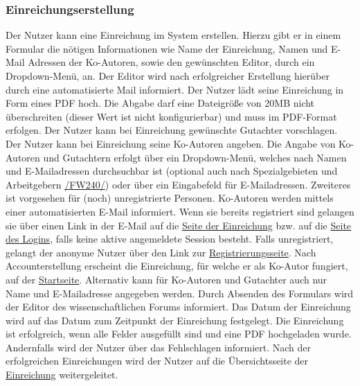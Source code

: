 \subsubsection{Einreichungserstellung}\label{nut:eein}
\begin{description}
     Der Nutzer kann eine Einreichung im System erstellen. Hierzu gibt er in einem
    Formular die nötigen Informationen wie Name der Einreichung, Namen und E-Mail Adressen der Ko-Autoren,
    sowie den gewünschten Editor, durch ein Dropdown-Menü, an. Der Editor wird nach erfolgreicher Erstellung hierüber durch eine
    automatisierte Mail informiert.
     Der Nutzer lädt seine Einreichung in Form eines PDF hoch. Die Abgabe darf eine Dateigröße
    von 20MB nicht überschreiten (dieser Wert ist nicht konfigurierbar) und muss im PDF-Format erfolgen.
     Der Nutzer kann bei Einreichung gewünschte Gutachter vorschlagen.
     Der Nutzer kann bei Einreichung seine Ko-Autoren angeben.
     Die Angabe von Ko-Autoren und Gutachtern erfolgt über ein Dropdown-Menü, welches
    nach Namen und E-Mailadressen durchsuchbar ist (optional auch nach Spezialgebieten und Arbeitgebern \hyperref[funkt:240]{/FW240/})
    oder über ein Eingabefeld für E-Mailadressen. Zweiteres ist vorgesehen für (noch) unregistrierte Personen.
     Ko-Autoren werden mittels einer automatisierten E-Mail informiert. Wenn sie bereits
    registriert sind gelangen sie über einen Link in der E-Mail auf die \hyperref[nut:ein]{Seite der Einreichung} bzw. auf die \hyperref[an:log]{Seite des Logins},
    falls keine aktive angemeldete Session besteht.
    Falls unregistriert, gelangt der anonyme Nutzer über den Link zur \hyperref[an:reg]{Registrierungsseite}. Nach Accounterstellung
    erscheint die Einreichung, für welche er als Ko-Autor fungiert, auf der \hyperref[nut:start]{Startseite}.
    Alternativ kann für Ko-Autoren und Gutachter auch nur Name und E-Mailadresse angegeben werden.
     Durch Absenden des Formulars wird der Editor des wissenschaftlichen Forums
    informiert. Das Datum der Einreichung wird auf das Datum zum Zeitpunkt der Einreichung festgelegt.
     Die Einreichung ist erfolgreich, wenn alle Felder ausgefüllt sind und eine PDF
    hochgeladen wurde. Andernfalls wird der Nutzer über das Fehlschlagen informiert.
     Nach der erfolgreichen Einreichungen wird der Nutzer auf die Übersichtsseite der
    \hyperref[nut:ein]{Einreichung} weitergeleitet.
\end{description}

